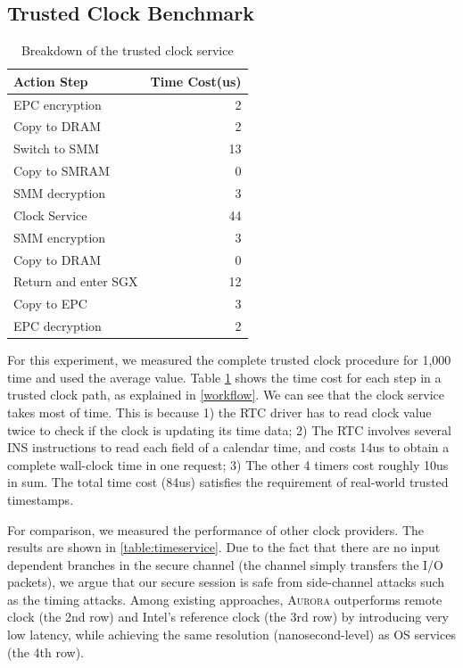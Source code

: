 \subsection{Trusted Clock Benchmark}\label{time_bench}

\begin{table}
	\centering
	\caption{ Breakdown of the trusted clock service}
	\small
	\label{table:breaktime}
	\begin{tabular}{lr}
		\toprule
		\textbf{Action Step} & \textbf{Time Cost(us)} \\
		\midrule
		EPC encryption & 2\\
		Copy to DRAM & 2\\
		Switch to SMM & 13\\
		Copy to SMRAM & 0\\
		SMM decryption & 3\\
		Clock Service & 44\\
		SMM encryption & 3\\
		Copy to DRAM & 0\\
		Return and enter SGX & 12\\
		Copy to EPC & 3\\
		EPC decryption & 2\\
		\bottomrule
	\end{tabular}
\end{table}

For this experiment, we measured the complete trusted clock procedure for 1,000 time and used the average value. Table \ref{table:breaktime} shows the time cost for each step in a trusted clock path, as explained in \autoref{workflow}. We can see that the clock service takes most of time. This is because 1) the RTC driver has to read clock value twice to check if the clock is updating its time data; 2) The RTC involves several \textsf{INS} instructions to read each field of a calendar time, and costs 14us to obtain a complete wall-clock time in one request; 3) The other 4 timers cost roughly 10us in sum. The total  time cost (84us) satisfies the requirement of real-world trusted timestamps.

For comparison, we measured the performance of other clock providers. The results are shown in \autoref{table:timeservice}. Due to the fact that there are no input dependent branches in the secure channel (the channel simply transfers the I/O packets), we argue that our secure session is safe from side-channel attacks such as the timing attacks. 
Among existing approaches, \textsc{Aurora} outperforms remote clock (the 2nd row) and Intel's reference clock (the 3rd row) by introducing very low latency, while achieving the same resolution (nanosecond-level) as OS services (the 4th row). 

